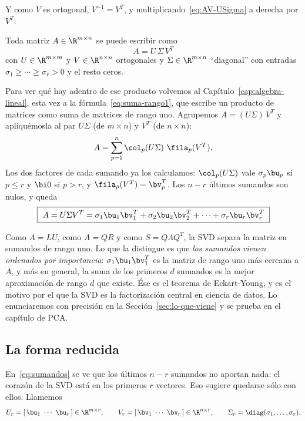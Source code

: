 Y como $V$ es ortogonal, $V^{-1}=V^T$, y multiplicando~\eqref{eq:AV-USigma} a
derecha por $V^T$:

\begin{theorem}\label{teo:SVD}
Toda matriz $A\in\R^{m\times n}$ se puede escribir como
\[
\boxed{\ A=U\,\Sigma\,V^T\ }
\]
con $U\in\R^{m\times m}$ y $V\in\R^{n\times n}$ ortogonales y
$\Sigma\in\R^{m\times n}$ ``diagonal'' con entradas
$\sigma_1\ge\cdots\ge\sigma_r>0$ y el resto ceros.
\end{theorem}

Para ver qué hay adentro de ese producto volvemos al Capítulo~\ref{cap:algebra-lineal},
esta vez a la fórmula~\eqref{eq:suma-rango1}, que escribe un producto de
matrices como suma de matrices de rango uno. Agrupemos $A=(U\Sigma)\,V^T$ y
apliquémosla al par $U\Sigma$ (de $m\times n$) y $V^T$ (de $n\times n$):
\[
A=\sum_{p=1}^{n}\col_p(U\Sigma)\ \fila_p(V^T) .
\]
Los dos factores de cada sumando ya los calculamos: $\col_p(U\Sigma)$ vale
$\sigma_p\bu_p$ si $p\le r$ y $\bi 0$ si $p>r$, y $\fila_p(V^T)=\bv_p^T$. Los
$n-r$ últimos sumandos son nulos, y queda
\begin{equation}\label{eq:sumandos}
\boxed{\ A=U\Sigma V^T
=\sigma_1\bu_1\bv_1^T+\sigma_2\bu_2\bv_2^T+\cdots+\sigma_r\bu_r\bv_r^T\ }
\end{equation}

\begin{remark}
Como $A=LU$, como $A=QR$ y como $S=Q\Lambda Q^T$, la SVD separa la matriz en
sumandos de rango uno. Lo que la distingue es que \emph{los sumandos vienen
ordenados por importancia}: $\sigma_1\bu_1\bv_1^T$ es la matriz de rango uno
más cercana a $A$, y más en general, la suma de los primeros $d$ sumandos es
la mejor aproximación de rango $d$ que existe. Ése es el teorema de
Eckart-Young, y es el motivo por el que la SVD es la factorización central en
ciencia de datos. Lo enunciaremos con precisión en la
Sección~\ref{sec:lo-que-viene} y se prueba en el capítulo de PCA.
\end{remark}

\subsection{La forma reducida}

En~\eqref{eq:sumandos} se ve que los últimos $n-r$ sumandos no aportan nada:
el corazón de la SVD está en los primeros $r$ vectores. Eso sugiere quedarse
sólo con ellos. Llamemos
\[
U_r=[\,\bu_1\ \cdots\ \bu_r\,]\in\R^{m\times r},
\qquad
V_r=[\,\bv_1\ \cdots\ \bv_r\,]\in\R^{n\times r},
\qquad
\Sigma_r=\diag(\sigma_1,\dots,\sigma_r) .
\]

